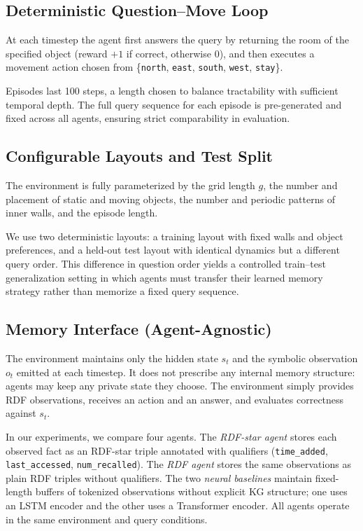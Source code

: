 \documentclass[11pt]{article}
\begin{document}
\subsection{Deterministic Question–Move Loop}

At each timestep the agent first answers the query by returning the room of the
specified object (reward $+1$ if correct, otherwise $0$), and then executes a
movement action chosen from \{\texttt{north}, \texttt{east}, \texttt{south},
\texttt{west}, \texttt{stay}\}.

Episodes last 100 steps, a length chosen to balance tractability with sufficient temporal depth.
The full query sequence for each episode is pre-generated and fixed across all agents, ensuring strict comparability in evaluation.

\subsection{Configurable Layouts and Test Split}

The environment is fully parameterized by the grid length $g$, the number and
placement of static and moving objects, the number and periodic patterns of
inner walls, and the episode length.

We use two deterministic layouts: a training layout with fixed walls and object
preferences, and a held-out test layout with identical dynamics but a different
query order. This difference in question order yields a controlled train–test
generalization setting in which agents must transfer their learned memory
strategy rather than memorize a fixed query sequence.

\subsection{Memory Interface (Agent-Agnostic)}

The environment maintains only the hidden state $s_t$ and the symbolic
observation $o_t$ emitted at each timestep. It does not prescribe any internal
memory structure: agents may keep any private state they choose. The
environment simply provides RDF observations, receives an action and an answer,
and evaluates correctness against $s_t$.

In our experiments, we compare four agents. The \emph{RDF-star agent}
stores each observed fact as an RDF-star triple annotated with qualifiers
(\texttt{time\_added}, \texttt{last\_accessed}, \texttt{num\_recalled}). The
\emph{RDF agent} stores the same observations as plain RDF triples without
qualifiers. The two \emph{neural baselines} maintain fixed-length buffers of
tokenized observations without explicit KG structure; one uses an LSTM
encoder and the other uses a Transformer encoder. All agents operate in the same environment and query conditions.
\end{document}
